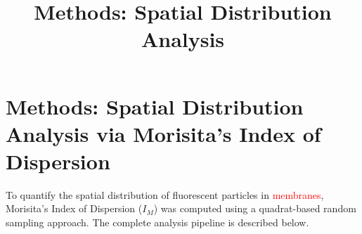 \doublespacing

\title{Methods: Spatial Distribution Analysis}
\author{}
\date{}



\maketitle

\section{Methods: Spatial Distribution Analysis via Morisita's Index of Dispersion}

To quantify the spatial distribution of fluorescent particles in \textcolor{red}{membranes}, Morisita's Index of Dispersion ($I_M$) was computed using a quadrat-based
random sampling approach. The complete analysis pipeline is described below.


